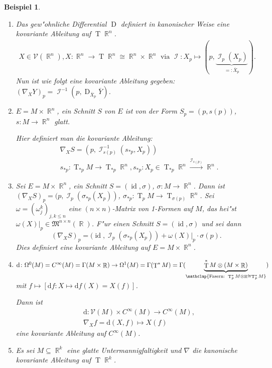 \documentclass[paper=A4, twoside, chapterprefix=true, bibliography=totoc, headsepline]{scrbook}
\DeclareMathOperator{\R}{\mathbb{R}}
\DeclareMathOperator{\calI}{\mathcal{I}}
\DeclareMathOperator{\D}{D}         %
\DeclareMathOperator{\Id}{id}       %
\DeclareMathOperator{\T}{T}         %
\newcommand{\dop}{\mathrm{d}}
\newcommand{\X}{\times}
\theoremstyle{plain}
\theoremstyle{nonumberplain}
\newtheorem{bsp}{Beispiel}
\theoremstyle{empty}
\theoremstyle{break}
\begin{document}
\begin{bsp}
  \begin{enumerate}[label=(\arabic*),leftmargin=*]
  \item Das gew"ohnliche Differential $\D$ definiert in kanonischer Weise eine kovariante Ableitung auf $\T\R^n$.
    \begin{align*}
      X \in \mathcal V(\R^n), X \colon \R^n \to \T\R^n \cong \R^n \times \R^n \text{ via } \calI\colon X_p \mapsto (p,\underbrace{\calI_p(X_p)}_{=:\overline X_p}).
    \end{align*}
    Nun ist wie folgt eine kovariante Ableitung gegeben: $(\nabla_XY)_p = \calI^{-1}(p,\D_{\overline X_p}\overline Y)$.
  \item $E = M \times \R^n$, ein Schnitt $S$ von $E$ ist von der Form $S_p = (p,s(p))$, $s \colon M \to \R^n$ glatt.

    Hier definiert man die kovariante Ableitung:
    \begin{align*}
      & \nabla_XS = (p,\calI_{s(p)}^{-1}(s_{*p},X_p))\\
      &  s_{*p}\colon \T_{*p}M \to \T_{*p}\R^n, s_{*p}\colon X_p \in \T_{*p}\R^n \xrightarrow{\calI_{s(p)}} \R^n.
    \end{align*}
  \item Sei $E = M \times \R^n$, ein Schnitt $S = (\Id, \sigma)$, $\sigma: M \to \R^n$. Dann ist $(\nabla_X S)_p = (p, \calI_p(\sigma_{*p}(X_p))$, $\sigma_{*p}: \T_pM \to \T_{\sigma(p)}\R^n$. Sei $ \omega = (\omega_j^k)_{j,k \le n}$ eine $(n\times n)$-Matrix von 1-Formen auf $M$, das hei"st $\omega(X)|_p \in \mathfrak M^{n\times n}(\R)$.
    F"ur einen Schnitt $S = (\Id, \sigma)$ und sei dann
    \[ (\nabla_XS)_p = (\Id, \calI_p(\sigma_{*p}(X_p)) + \omega(X)|_p \cdot \sigma(p). \]
    Dies definiert eine kovariante Ableitung auf $E = M \X \R^n$.
  \item $\dop \colon \Omega^0(M) = C^{\infty}(M) = \Gamma(M\times \R) \to \Omega^1(M) = \Gamma(\T^{*}M) = \Gamma(\underbrace{\T^{*}M \otimes (M \times \R)}_{\mathclap{\text{Fasern: } \T_p^{*}M\otimes\R \cong \T_p^{*}M}})$ mit $f \mapsto [\dop f \colon X \mapsto \dop f(X) = X(f)]$.

    Dann ist
    \begin{align*}
      & \dop \colon \mathcal V(M) \times C^{\infty}(M) \to C^{\infty}(M),\\
      & \nabla_Xf = \dop (X,f) \mapsto X(f)
    \end{align*}
    eine kovariante Ableitung auf $C^{\infty}(M)$.
  \item
    Es sei $M \subseteq \R^k$ eine glatte Untermannigfaltigkeit und $\nabla$ die kanonische kovariante Ableitung auf $\T \R^k$.


\end{enumerate}
\end{bsp}
\end{document}
